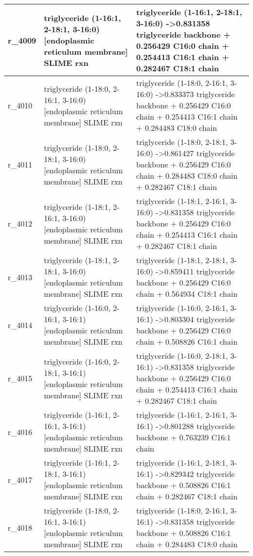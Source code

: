 \begin{landscape}
{\begin{longtable}{|l|p{7cm}|p{15cm}|}
r\_4009 & triglyceride (1-16:1, 2-18:1, 3-16:0) {[}endoplasmic reticulum membrane{]} SLIME rxn & triglyceride (1-16:1, 2-18:1, 3-16:0)  -\textgreater 0.831358 triglyceride backbone + 0.256429 C16:0 chain + 0.254413 C16:1 chain + 0.282467 C18:1 chain \\ \hline
r\_4010 & triglyceride (1-18:0, 2-16:1, 3-16:0) {[}endoplasmic reticulum membrane{]} SLIME rxn & triglyceride (1-18:0, 2-16:1, 3-16:0)  -\textgreater 0.833373 triglyceride backbone + 0.256429 C16:0 chain + 0.254413 C16:1 chain + 0.284483 C18:0 chain \\ \hline
r\_4011 & triglyceride (1-18:0, 2-18:1, 3-16:0) {[}endoplasmic reticulum membrane{]} SLIME rxn & triglyceride (1-18:0, 2-18:1, 3-16:0)  -\textgreater 0.861427 triglyceride backbone + 0.256429 C16:0 chain + 0.284483 C18:0 chain + 0.282467 C18:1 chain \\ \hline
r\_4012 & triglyceride (1-18:1, 2-16:1, 3-16:0) {[}endoplasmic reticulum membrane{]} SLIME rxn & triglyceride (1-18:1, 2-16:1, 3-16:0)  -\textgreater 0.831358 triglyceride backbone + 0.256429 C16:0 chain + 0.254413 C16:1 chain + 0.282467 C18:1 chain \\ \hline
r\_4013 & triglyceride (1-18:1, 2-18:1, 3-16:0) {[}endoplasmic reticulum membrane{]} SLIME rxn & triglyceride (1-18:1, 2-18:1, 3-16:0)  -\textgreater 0.859411 triglyceride backbone + 0.256429 C16:0 chain + 0.564934 C18:1 chain \\ \hline
r\_4014 & triglyceride (1-16:0, 2-16:1, 3-16:1) {[}endoplasmic reticulum membrane{]} SLIME rxn & triglyceride (1-16:0, 2-16:1, 3-16:1)  -\textgreater 0.803304 triglyceride backbone + 0.256429 C16:0 chain + 0.508826 C16:1 chain \\ \hline
r\_4015 & triglyceride (1-16:0, 2-18:1, 3-16:1) {[}endoplasmic reticulum membrane{]} SLIME rxn & triglyceride (1-16:0, 2-18:1, 3-16:1)  -\textgreater 0.831358 triglyceride backbone + 0.256429 C16:0 chain + 0.254413 C16:1 chain + 0.282467 C18:1 chain \\ \hline
r\_4016 & triglyceride (1-16:1, 2-16:1, 3-16:1) {[}endoplasmic reticulum membrane{]} SLIME rxn & triglyceride (1-16:1, 2-16:1, 3-16:1)  -\textgreater 0.801288 triglyceride backbone + 0.763239 C16:1 chain \\ \hline
r\_4017 & triglyceride (1-16:1, 2-18:1, 3-16:1) {[}endoplasmic reticulum membrane{]} SLIME rxn & triglyceride (1-16:1, 2-18:1, 3-16:1)  -\textgreater 0.829342 triglyceride backbone + 0.508826 C16:1 chain + 0.282467 C18:1 chain \\ \hline
r\_4018 & triglyceride (1-18:0, 2-16:1, 3-16:1) {[}endoplasmic reticulum membrane{]} SLIME rxn & triglyceride (1-18:0, 2-16:1, 3-16:1)  -\textgreater 0.831358 triglyceride backbone + 0.508826 C16:1 chain + 0.284483 C18:0 chain \\ \hline

\end{longtable}}
\end{landscape}
